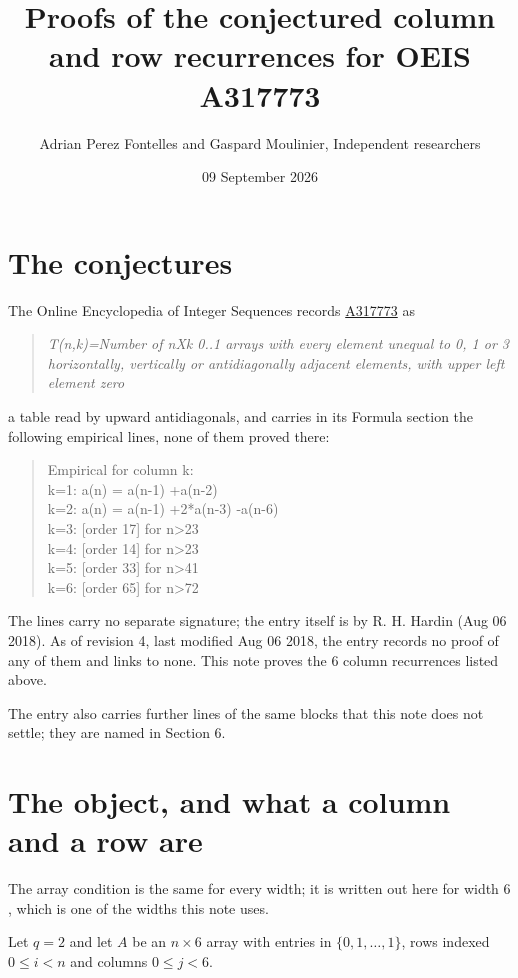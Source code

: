 \documentclass[11pt]{article}
\title{Proofs of the conjectured column and row recurrences for OEIS A317773}
\author{Adrian Perez Fontelles and Gaspard Moulinier, Independent researchers}
\date{09 September 2026}
\theoremstyle{definition}
\begin{document}
\maketitle
\section{The conjectures}

The Online Encyclopedia of Integer Sequences records \href{https://oeis.org/A317773}{A317773} as

\begin{quote}\itshape T(n,k)=Number of nXk 0..1 arrays with every element unequal to 0, 1 or 3 horizontally, vertically or antidiagonally adjacent elements, with upper left element zero\end{quote}

a table read by upward antidiagonals, and carries in its Formula section the following empirical lines, none of them proved there:

\begin{quote}\ttfamily Empirical for column k:\\
k=1: a(n) = a(n-1) +a(n-2)\\k=2: a(n) = a(n-1) +2*a(n-3) -a(n-6)\\k=3: [order 17] for n>23\\k=4: [order 14] for n>23\\k=5: [order 33] for n>41\\k=6: [order 65] for n>72\end{quote}

The lines carry no separate signature; the entry itself is by R. H. Hardin (Aug 06 2018). As of revision 4, last modified Aug 06 2018, the entry records no proof of any of them and links to none. This note proves the 6 column recurrences listed above.

The entry also carries further lines of the same blocks that this note does not settle; they are named in Section 6.

\section{The object, and what a column and a row are}

The array condition is the same for every width; it is written out here for width $6$, which is one of the widths this note uses.

Let $q = 2$ and let $A$ be an $n \times 6$ array with entries in $\{0,1,\dots,1\}$, rows indexed $0 \le i < n$ and columns $0 \le j < 6$.
\end{document}
